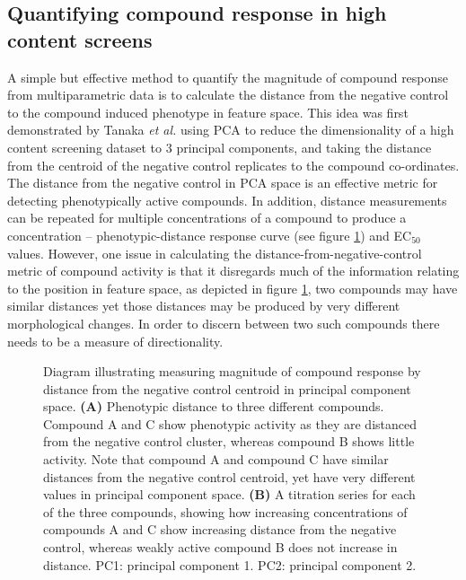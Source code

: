 \documentclass[a4paper,11pt,twoside,openright]{scrbook}
\begin{document}
\subsection{Quantifying compound response in high content screens}
A simple but effective method to quantify the magnitude of compound response from multiparametric data is to calculate 
the distance from the negative control to the compound induced phenotype in feature space.
This idea was first demonstrated by Tanaka \textit{et al.} using PCA to reduce the dimensionality of a high content 
screening dataset to 3 principal components, and taking the distance from the centroid of the negative control 
replicates to the compound co-ordinates. \cite{Tanaka2005}
The distance from the negative control in PCA space is an effective metric for detecting phenotypically active 
compounds.
In addition, distance measurements can be repeated for multiple concentrations of a compound to produce a concentration 
-- phenotypic-distance response curve (see figure \ref{figure:pca_dist}) and EC$_{50}$ values.
However, one issue in calculating the distance-from-negative-control metric of compound activity is that it disregards 
much of the information relating to the position in feature space, as depicted in figure \ref{figure:pca_dist}, two 
compounds may have similar distances yet those distances may be produced by very different morphological changes.
In order to discern between two such compounds there needs to be a measure of directionality.

\begin{figure}
    \captionsetup{width=0.8\textwidth}
    \caption[Compound distance in principal component space]{
    Diagram illustrating measuring magnitude of compound response by distance from the negative control centroid in 
principal component space.
    \textbf{(A)} Phenotypic distance to three different compounds.
    Compound A and C show phenotypic activity as they are distanced from the negative control cluster, whereas compound 
B shows little activity.
    Note that compound A and compound C have similar distances from the negative control centroid, yet have very 
different values in principal component space.
    \textbf{(B)} A titration series for each of the three compounds, showing how increasing concentrations of compounds 
A and C show increasing distance from the negative control, whereas weakly active compound B does not increase in 
distance.
PC1: principal component 1. PC2: principal component 2.
}
    
    \label{figure:pca_dist}
\end{figure}
\end{document}
